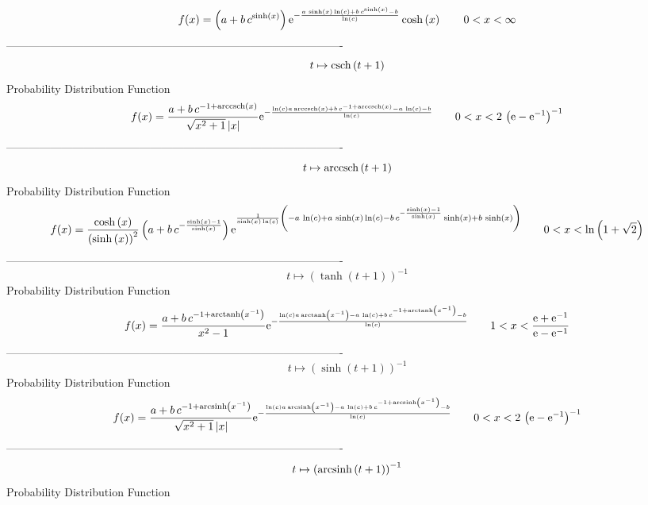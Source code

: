 \documentclass[12pt]{article}
\begin{document}
$$  f(x)= \left( a+b\,{c}^{\sinh \left( x \right) } \right) {{\rm e}^{-{\frac {
a\,\sinh \left( x \right) \ln  \left( c \right) +b\,{c}^{\sinh \left( 
x \right) }-b}{\ln  \left( c \right) }}}}\cosh \left( x \right) 
 \qquad0
 < x < \infty 
$$-------------------------------------------------------------------------------------------  \\$$t\mapsto {\rm csch} \left(t+1\right)
$$Probability Distribution Function 
$$  f(x)={\frac {a+b\,{c}^{-1+{\rm arccsch} \left(x\right)}}{\sqrt {{x}^{2}+1}
 \left| x \right| }{{\rm e}^{-{\frac {\ln  \left( c \right) a\,
{\rm arccsch} \left(x\right)+b\,{c}^{-1+{\rm arccsch} \left(x\right)}-
a\,\ln  \left( c \right) -b}{\ln  \left( c \right) }}}}}
 \qquad0
 < x < 2\, \left( {\rm e}-{{\rm e}^{-1}} \right) ^{-1}
$$-------------------------------------------------------------------------------------------  \\$$t\mapsto {\rm arccsch} \left(t+1\right)
$$Probability Distribution Function 
$$  f(x)={\frac {\cosh \left( x \right) }{ \left( \sinh \left( x \right) 
 \right) ^{2}} \left( a+b\,{c}^{-{\frac {\sinh \left( x \right) -1}{
\sinh \left( x \right) }}} \right) {{\rm e}^{{\frac {1}{\sinh \left( x
 \right) \ln  \left( c \right) } \left( -a\,\ln  \left( c \right) +a\,
\sinh \left( x \right) \ln  \left( c \right) -b\,{c}^{-{\frac {\sinh
 \left( x \right) -1}{\sinh \left( x \right) }}}\sinh \left( x
 \right) +b\,\sinh \left( x \right)  \right) }}}}
 \qquad0
 < x < \ln  \left( 1+\sqrt {2} \right) 
$$-------------------------------------------------------------------------------------------  \\$$t\mapsto  \left( \tanh \left( t+1 \right)  \right) ^{-1}
$$Probability Distribution Function 
$$  f(x)={\frac {a+b\,{c}^{-1+{\rm arctanh} \left({x}^{-1}\right)}}{{x}^{2}-1}{
{\rm e}^{-{\frac {\ln  \left( c \right) a\,{\rm arctanh} \left({x}^{-1
}\right)-a\,\ln  \left( c \right) +b\,{c}^{-1+{\rm arctanh} \left({x}^
{-1}\right)}-b}{\ln  \left( c \right) }}}}}
 \qquad1
 < x < {\frac {{\rm e}+{{\rm e}^{-1}}}{{\rm e}-{{\rm e}^{-1}}}}
$$-------------------------------------------------------------------------------------------  \\$$t\mapsto  \left( \sinh \left( t+1 \right)  \right) ^{-1}
$$Probability Distribution Function 
$$  f(x)={\frac {a+b\,{c}^{-1+{\rm arcsinh} \left({x}^{-1}\right)}}{\sqrt {{x}^
{2}+1} \left| x \right| }{{\rm e}^{-{\frac {\ln  \left( c \right) a\,
{\rm arcsinh} \left({x}^{-1}\right)-a\,\ln  \left( c \right) +b\,{c}^{
-1+{\rm arcsinh} \left({x}^{-1}\right)}-b}{\ln  \left( c \right) }}}}}
 \qquad0
 < x < 2\, \left( {\rm e}-{{\rm e}^{-1}} \right) ^{-1}
$$-------------------------------------------------------------------------------------------  \\$$t\mapsto  \left( {\rm arcsinh} \left(t+1\right) \right) ^{-1}
$$Probability Distribution Function 
\end{document}
